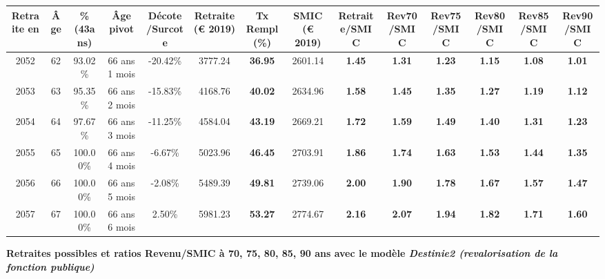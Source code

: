 \begin{adjustbox}{max width=\textwidth} 
\begin{tabular}[htb]{|c|c||c|c|c||c|c||c||c|c|c|c|c|c|} 
\hline 
 Retraite en &  Âge &  \%(43ans) &  Âge pivot &  Décote/Surcote &  Retraite (\euro{} 2019) &  Tx Rempl(\%) &  SMIC (\euro{} 2019) &  Retraite/SMIC &  Rev70/SMIC &  Rev75/SMIC &  Rev80/SMIC &  Rev85/SMIC &  Rev90/SMIC \\ 
\hline \hline 
 2052 &  62 &  93.02\% &  66 ans 1 mois &  -20.42\% &  3777.24 &  {\bf 36.95} &  2601.14 &  {\bf 1.45} &  {\bf 1.31} &  {\bf 1.23} &  {\bf 1.15} &  {\bf 1.08} &  {\bf 1.01} \\ 
\hline 
 2053 &  63 &  95.35\% &  66 ans 2 mois &  -15.83\% &  4168.76 &  {\bf 40.02} &  2634.96 &  {\bf 1.58} &  {\bf 1.45} &  {\bf 1.35} &  {\bf 1.27} &  {\bf 1.19} &  {\bf 1.12} \\ 
\hline 
 2054 &  64 &  97.67\% &  66 ans 3 mois &  -11.25\% &  4584.04 &  {\bf 43.19} &  2669.21 &  {\bf 1.72} &  {\bf 1.59} &  {\bf 1.49} &  {\bf 1.40} &  {\bf 1.31} &  {\bf 1.23} \\ 
\hline 
 2055 &  65 &  100.00\% &  66 ans 4 mois &  -6.67\% &  5023.96 &  {\bf 46.45} &  2703.91 &  {\bf 1.86} &  {\bf 1.74} &  {\bf 1.63} &  {\bf 1.53} &  {\bf 1.44} &  {\bf 1.35} \\ 
\hline 
 2056 &  66 &  100.00\% &  66 ans 5 mois &  -2.08\% &  5489.39 &  {\bf 49.81} &  2739.06 &  {\bf 2.00} &  {\bf 1.90} &  {\bf 1.78} &  {\bf 1.67} &  {\bf 1.57} &  {\bf 1.47} \\ 
\hline 
 2057 &  67 &  100.00\% &  66 ans 6 mois &  2.50\% &  5981.23 &  {\bf 53.27} &  2774.67 &  {\bf 2.16} &  {\bf 2.07} &  {\bf 1.94} &  {\bf 1.82} &  {\bf 1.71} &  {\bf 1.60} \\ 
\hline 
\hline 
\end{tabular} 
\end{adjustbox} 
 
 \vspace{0.1cm} 
{\bf \noindent Retraites possibles et ratios Revenu/SMIC à 70, 75, 80, 85, 90 ans avec le modèle \emph{Destinie2 (revalorisation de la fonction publique)}}  
 
